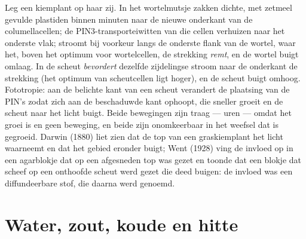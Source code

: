 \begin{example}\label{ex:b3:plant-molecular-physiology:tropism}
Leg een kiemplant op haar zij. In het wortelmutsje zakken dichte, met
zetmeel gevulde plastiden binnen minuten naar de nieuwe onderkant van
de columellacellen; de PIN3-transporteiwitten van die cellen verhuizen
naar het onderste vlak;  stroomt bij voorkeur langs de onderste
flank van de wortel, waar het, boven het optimum voor wortelcellen, de
strekking \emph{remt}, en de wortel buigt omlaag. In de scheut
\emph{bevordert} dezelfde zijdelingse stroom naar de onderkant de
strekking (het optimum van scheutcellen ligt hoger), en de scheut buigt
omhoog. Fototropie:  aan de belichte kant van een scheut
verandert de plaatsing van de PIN's zodat  zich aan de
beschaduwde kant ophoopt, die sneller groeit en de scheut naar het
licht buigt. Beide bewegingen zijn traag --- uren --- omdat het groei
is en geen beweging, en beide zijn onomkeerbaar in het weefsel dat is
gegroeid. Darwin (1880) liet zien dat de top van een graskiemplant het
licht waarneemt en dat het gebied eronder buigt; Went (1928) ving de
invloed op in een agarblokje dat op een afgesneden top was gezet en
toonde dat een blokje dat scheef op een onthoofde scheut werd gezet die
deed buigen: de invloed was een diffundeerbare stof, die daarna 
werd genoemd.
\end{example}

\section{Water, zout, koude en hitte}

